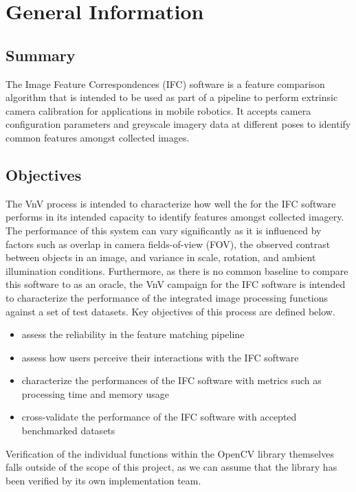\documentclass[12pt, titlepage]{article}
\begin{document}
\section{General Information}

\subsection{Summary}
The Image Feature Correspondences (IFC) software is a feature comparison algorithm that is intended 
to be used as part of a pipeline to perform extrinsic camera calibration for 
applications in mobile robotics. It accepts camera configuration parameters and greyscale imagery data at 
different poses to identify common features amongst collected images. 

\subsection{Objectives}
The VnV process is intended to characterize how well the for the IFC software performs in its 
intended capacity to identify features amongst collected imagery. The performance of this system 
can vary significantly as it is influenced by factors such as overlap in camera fields-of-view (FOV),
the observed contrast between objects in an image, and variance in scale, rotation, and ambient 
illumination conditions. Furthermore, as there is no common baseline to compare this software to as 
an oracle, the VnV campaign for the IFC software is intended to characterize the performance of the 
integrated image processing functions against a set of test datasets. Key objectives of this process 
are defined below.

\begin{itemize}
  \item assess the reliability in the feature matching pipeline
  \item assess how users perceive their interactions with the IFC software 
  \item characterize the performances of the IFC software with metrics such as processing time and 
  memory usage
  \item cross-validate the performance of the IFC software with accepted benchmarked datasets
\end{itemize}

Verification of the individual functions within the OpenCV library themselves falls outside of the 
scope of this project, as we can assume that the library has been verified by its own 
implementation team. 
\\ \\
\end{document}

